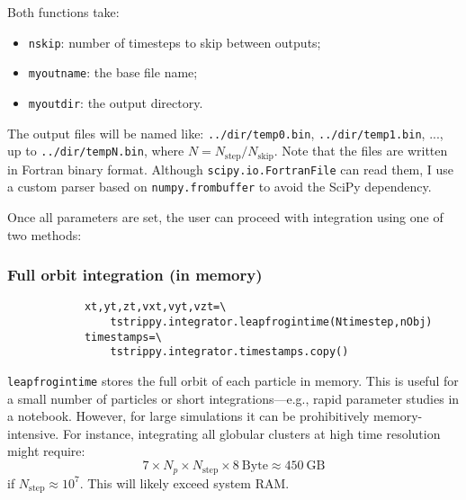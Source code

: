 \documentclass{article}
\begin{document}
        Both functions take:
        \begin{itemize}
            \item \texttt{nskip}: number of timesteps to skip between outputs;
            \item\texttt{myoutname}: the base file name;
            \item \texttt{myoutdir}: the output directory.
        \end{itemize}

        The output files will be named like: \texttt{../dir/temp0.bin}, \texttt{../dir/temp1.bin}, ..., up to \texttt{../dir/tempN.bin}, where $N = N_\mathrm{step} / N_\mathrm{skip}$. Note that the files are written in Fortran binary format. Although \texttt{scipy.io.FortranFile} can read them, I use a custom parser based on \texttt{numpy.frombuffer} to avoid the SciPy dependency.

        Once all parameters are set, the user can proceed with integration using one of two methods:

        \subsubsection*{Full orbit integration (in memory)}
        \small
        \begin{lstlisting}
            xt,yt,zt,vxt,vyt,vzt=\
                tstrippy.integrator.leapfrogintime(Ntimestep,nObj) 
            timestamps=\
                tstrippy.integrator.timestamps.copy()
        \end{lstlisting}
        \normalsize
        \texttt{leapfrogintime} stores the full orbit of each particle in memory. This is useful for a small number of particles or short integrations—e.g., rapid parameter studies in a notebook. However, for large simulations it can be prohibitively memory-intensive. For instance, integrating all globular clusters at high time resolution might require:
        \begin{equation}
            7 \times N_p \times N_\mathrm{step} \times 8~\mathrm{Byte} \approx 450~\mathrm{GB}
        \end{equation}
        if $N_\mathrm{step} \approx 10^7$. This will likely exceed system RAM.
\end{document}
